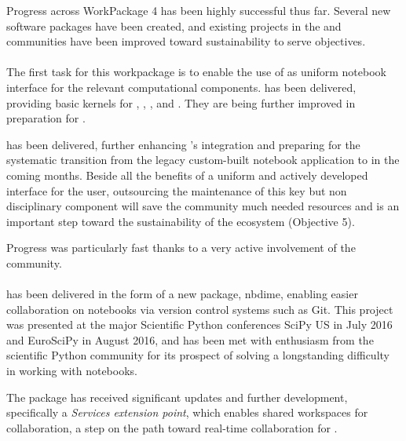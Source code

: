 \documentclass{deliverablereport}
\begin{document}
Progress across WorkPackage 4 has been highly successful thus far.
Several new software packages have been created,
and existing projects in the \Sage and \Jupyter communities have been improved toward sustainability to serve \ODK objectives.

\paragraph{}
\label{UI@ipython-kernels}
The first task for this workpackage is to enable the use of \Jupyter
as uniform notebook interface for the relevant computational
components.  has been delivered,
providing basic \Jupyter kernels for \GAP, \Pari, \Sage, and
\Singular. They are being further improved in preparation for
.

 has been delivered, further
enhancing \Sage's \Jupyter integration and preparing for the
systematic transition from the legacy custom-built \Sage notebook
application to \Jupyter in the coming months. Beside all the benefits
of a uniform and actively developed interface for the user,
outsourcing the maintenance of this key but non disciplinary component
will save the \Sage community much needed resources and is an
important step toward the sustainability of the \ODK ecosystem
(Objective 5).

Progress was particularly fast thanks to a very active involvement of
the \Sage community.

\paragraph{}

 has been delivered in the form of a new \Jupyter package, nbdime,
enabling easier collaboration on notebooks via version control systems such as Git. This project
was presented at the major Scientific Python conferences SciPy US in July 2016 and EuroSciPy in August 2016,
and has been met with enthusiasm from the scientific Python community for its prospect of solving a
longstanding difficulty in working with notebooks.

The \JupyterHub package has received significant updates and further development, specifically a
\emph{Services extension point}, which enables shared workspaces for collaboration, a step on the path
toward real-time collaboration for .
\end{document}
